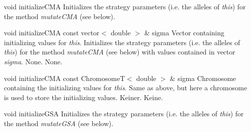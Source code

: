 \vspace*{4ex}

\setNormalInstance
\setCorrectWidthThree{8pt}
\printMethodWithParamsSaved
{void}
{}
{initializeCMA}
{Initializes the strategy parameters (i.e. the alleles of
 {\em this}) for the method {\em mutateCMA} (see below).}
{}
\setCorrectWidthThree{4pt}

\clearpage

\setNormalInstance
\printMethodWithOneParam
{void}
{initializeCMA}
{const vector$<$ double $>$ \&}
{sigma}
{Vector containing initializing values for {\em this}.}
{Initializes the strategy parameters (i.e. the alleles of
 {\em this}) for the method {\em mutateCMA} (see below) with 
 values contained in vector {\em sigma}.}
{None.}
{None.}

\vspace*{4ex}

\setNormalInstance
\printMethodWithOneParam
{void}
{initializeCMA}
{const ChromosomeT$<$ double $>$ \&}
{sigma}
{Chromosome containing the initializing values for {\em this}.}
{Same as above, but here a chromosome is used to store
 the initializing values.}
{Keiner.}
{Keine.}

\vspace*{4ex}

\setNormalInstance
\setCorrectWidthThree{8pt}
\printMethodWithParamsSaved
{void}
{}
{initializeGSA}
{Initializes the strategy parameters (i.e. the alleles of
 {\em this}) for the method {\em mutateGSA} (see below).}
{}
\setCorrectWidthThree{4pt}

